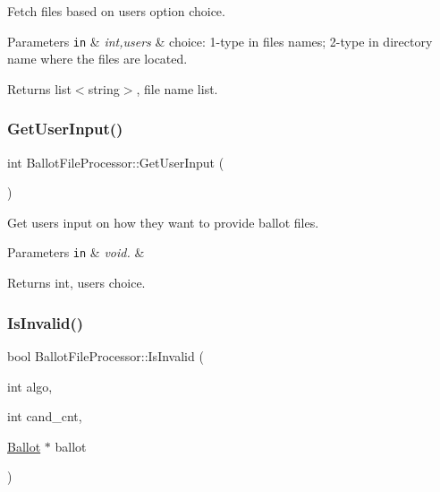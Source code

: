 Fetch files based on user\textquotesingle{}s option choice. 


\begin{DoxyParams}[1]{Parameters}
\mbox{\tt in}  & {\em int,user\textquotesingle{}s} & choice\+: 1-\/type in files\textquotesingle{} names; 2-\/type in directory name where the files are located.\\
\hline
\end{DoxyParams}
\begin{DoxyReturn}{Returns}
list$<$string$>$, file name list. 
\end{DoxyReturn}
\mbox{\label{classBallotFileProcessor_a2a14b51d82b1873d576fe51ef861701f}} 
\subsubsection{\texorpdfstring{Get\+User\+Input()}{GetUserInput()}}
{\footnotesize\ttfamily int Ballot\+File\+Processor\+::\+Get\+User\+Input (\begin{DoxyParamCaption}{ }\end{DoxyParamCaption})}



Get user\textquotesingle{}s input on how they want to provide ballot files. 


\begin{DoxyParams}[1]{Parameters}
\mbox{\tt in}  & {\em void.} & \\
\hline
\end{DoxyParams}
\begin{DoxyReturn}{Returns}
int, user\textquotesingle{}s choice. 
\end{DoxyReturn}
\mbox{\label{classBallotFileProcessor_ab5fa519ae4703ac435535242070902b9}} 
\subsubsection{\texorpdfstring{Is\+Invalid()}{IsInvalid()}}
{\footnotesize\ttfamily bool Ballot\+File\+Processor\+::\+Is\+Invalid (\begin{DoxyParamCaption}\item[{int}]{algo,  }\item[{int}]{cand\+\_\+cnt,  }\item[{\hyperlink{classBallot}{Ballot} $\ast$}]{ballot }\end{DoxyParamCaption})}



